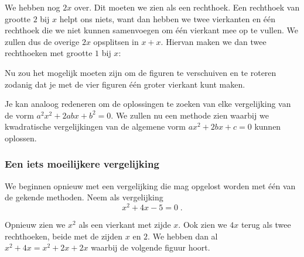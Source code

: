 \begin{center}

\end{center}

We hebben nog $2x$ over. Dit moeten we zien als een rechthoek. Een rechthoek van grootte $2$ bij $x$ helpt ons niets, want dan hebben we twee vierkanten en \'e\'en rechthoek die we niet kunnen samenvoegen om \'e\'en vierkant mee op te vullen. We zullen dus de overige $2x$ opsplitsen in $x + x$. Hiervan maken we dan twee rechthoeken met grootte $1$ bij $x$:

\begin{center}

\end{center}

Nu zou het mogelijk moeten zijn om de figuren te verschuiven en te roteren zodanig dat je met de vier figuren \'e\'en groter vierkant kunt maken.


\answer[5cm]{
\begin{center}

\end{center}
}



Je kan analoog redeneren om de oplossingen te zoeken van elke vergelijking van de vorm $a^2x^2+2abx+b^2=0$. We zullen nu een methode zien waarbij we kwadratische vergelijkingen van de algemene vorm $ax^2+2bx+c=0$ kunnen oplossen.

\subsubsection{Een iets moeilijkere vergelijking}

We beginnen opnieuw met een vergelijking die mag opgelost worden met \'e\'en van de gekende methoden. Neem als vergelijking
$$
x^2+4x-5=0\;.
$$

Opnieuw zien we $x^2$ als een vierkant met zijde $x$. Ook zien we $4x$ terug als twee rechthoeken, beide met de zijden $x$ en $2$. We hebben dan al $x^2+4x=x^2+2x+2x$ waarbij de volgende figuur hoort.
\begin{center}

\end{center}

